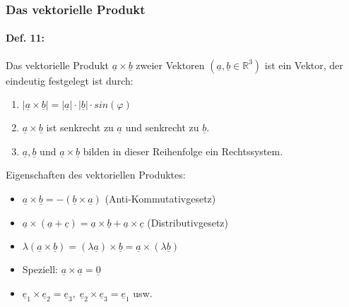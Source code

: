 \begin{enumerate}
\subsubsection{Das vektorielle Produkt}
\paragraph{Def. 11:} \parskp
Das vektorielle Produkt $\underline{a} \times \underline{b}$ zweier Vektoren $(\underline{a}, \underline{b} \in \mathbb{R}^3)$ ist ein Vektor, der eindeutig festgelegt ist durch:
\begin{enumerate}[label=(\arabic*)]
\item $|\underline{a} \times \underline{b}| = |\underline{a}| \cdot |\underline{b}| \cdot sin(\varphi)$
\item $\underline{a} \times \underline{b}$ ist senkrecht zu $\underline{a}$ und senkrecht zu $\underline{b}$.
\item $\underline{a}, \underline{b}$ und $\underline{a}\times \underline{b}$ bilden in dieser Reihenfolge ein Rechtssystem.
\end{enumerate}
Eigenschaften des vektoriellen Produktes:
\begin{itemize}
\item $\underline{a} \times \underline{b} = -(\underline{b}\times \underline{a})$ (Anti-Kommutativgesetz)
\item $\underline{a} \times (\underline{a} + \underline{c})=\underline{a} \times \underline{b} + \underline{a} \times \underline{c}$ (Distributivgesetz)
\item $\lambda (\underline{a} \times \underline{b} )= (\lambda \underline{a}) \times \underline{b}= \underline{a} \times (\lambda \underline{b})$
\item Speziell: $\underline{a} \times \underline{a} = \underline{0}$
\item $\underline{e}_1 \times \underline{e}_2= \underline{e}_3,\; \underline{e}_2\times \underline{e}_3=\underline{e}_1$ usw.
\end{itemize}


\end{enumerate}
